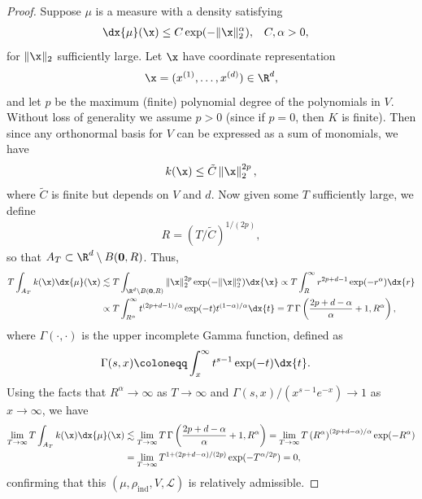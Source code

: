 \documentclass[10pt,dvipsnames]{amsart}
\begin{document}
\begin{proof}
Suppose $\mu$ is a measure with a density satisfying
\begin{align*}
  \dx{\mu}(\x) &\leq C \exp(-\|\x\|_2^\alpha), & C, \alpha &> 0,
\end{align*}
for $\|\x\|_2$ sufficiently large.  Let $\x$ have coordinate representation 
\begin{align*}
  \x = (x^{(1)}, \ldots, x^{(d)}) \in \R^d,
\end{align*}
and let $p$ be the maximum (finite) polynomial degree of the polynomials in $V$. Without loss of generality we assume $p > 0$ (since if $p = 0$, then $K$ is finite).
Then since any orthonormal basis for $V$ can be expressed as a sum of monomials, we have
\begin{align*}
  k(\x) \leq \tilde{C} \left\| \x \right\|_2^{2p},
\end{align*}
where $\tilde{C}$ is finite but depends on $V$ and $d$. Now given some $T$ sufficiently large, we define
\begin{align*}
  R = \left(T/\tilde{C}\right)^{1/(2p)},
\end{align*}
so that $A_T \subset \R^d \setminus B(\mathbf{0},R)$. Thus,
\begin{align*}
  T \int_{A_T} k(\x) \dx{\mu}(\x) &\lesssim T \int_{\R^d \setminus B(\mathbf{0},R)} \|\x\|_2^{2p} \exp(-\|\x\|_2^\alpha) \dx{\x} \propto T \int_R^\infty r^{2p+d-1} \exp(-r^\alpha) \dx{r} \\
  &\propto T \int_{R^\alpha}^\infty t^{(2p+d-1)/\alpha} \exp(-t) t^{(1-\alpha)/\alpha} \dx{t} = T \, \Gamma\left(\frac{2p+d-\alpha}{\alpha} + 1, R^\alpha\right),
\end{align*}
where $\Gamma(\cdot,\cdot)$ is the upper incomplete Gamma function, defined as
\begin{align*}
  \Gamma(s,x) &\coloneqq \int_x^\infty t^{s-1} \exp(-t) \dx{t}.
\end{align*}
Using the facts that $R^\alpha \to \infty$ as $T \to \infty$ and $\Gamma(s,x)/(x^{s-1} e^{-x}) \to 1$ as $x \to \infty$, we have
\begin{align*}
  \lim_{T \to \infty} T \int_{A_T} k(\x)\dx{\mu}(\x) &\lesssim \lim_{T \to \infty} T \, \Gamma\left(\frac{2p+d-\alpha}{\alpha} + 1, R^\alpha\right) = \lim_{T \to \infty} T \left(R^\alpha\right)^{(2p+d-\alpha)/\alpha} \exp(-R^\alpha)  \\
&= \lim_{T \to \infty} T^{1 + (2p+d-\alpha)/(2p)} \exp(-T^{\alpha/2p}) = 0,
\end{align*}
confirming that this $(\mu, \rho_{\mathrm{ind}},V,\mathcal L)$ is relatively admissible.
\end{proof}
\end{document}
